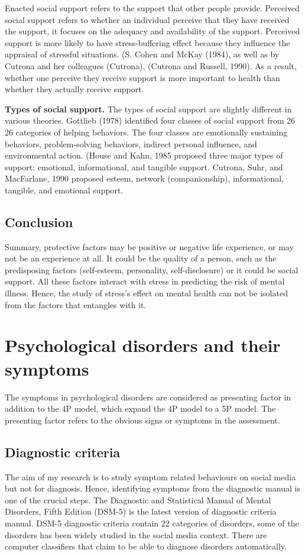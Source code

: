 Enacted social support refers to the support that other people provide. Perceived social support refers to whether an individual perceive that they have received the support, it focuses on the adequacy and availability of the support.  Perceived support is more likely to have stress-buffering effect because they influence the appraisal of stressful situations. (S. Cohen and McKay (1984), as well as by Cutrona and her colleagues (Cutrona), (Cutrona
and Russell, 1990). As a result, whether one perceive they receive support is more important to health than whether they actually receive support. 


\textbf{Types of social support.} The types of social support are slightly different in various theories. Gottlieb (1978) identified four classes of social support from 26  26 categories of helping behaviors. The four classes are emotionally sustaining behaviors, problem-solving behaviors, indirect personal influence, and environmental action. (House and Kahn, 1985 proposed three major types of support: emotional, informational, and tangible support. Cutrona, Suhr, and MacFarlane, 1990 proposed esteem, network (companionship), informational, tangible, and emotional support.


\subsection{Conclusion}
Summary, protective factors may be positive or negative life experience, or may not be an experience at all. It could be the quality of a person, such as the predisposing factors (self-esteem, personality, self-disclosure) or it could be social support. All these factors interact with stress in predicting the risk of mental illness. Hence, the study of stress's effect on mental health can not be isolated from the factors that entangles with it. 


\section{Psychological disorders and their symptoms}

The symptoms in psychological disorders are considered as presenting factor in addition to the 4P model, which expand the 4P model to a 5P model. The presenting factor refers to the obvious signs or symptoms in the assessment.

\subsection{Diagnostic criteria}
The aim of my research is to study symptom related behaviours on social media but not for diagnosis. Hence, identifying symptoms from the diagnostic manual is one of the crucial steps. The Diagnostic and Statistical Manual of Mental Disorders, Fifth Edition (DSM-5) is the latest version of diagnostic criteria manual. DSM-5 diagnostic criteria contain 22 categories of disorders, some of the disorders has been widely studied in the social media context. There are computer classifiers that claim to be able to diagnose disorders automatically.

